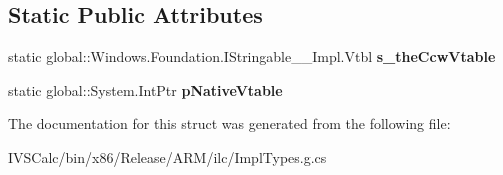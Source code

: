 \subsection*{Static Public Attributes}
\begin{DoxyCompactItemize}
\item 
\mbox{\label{struct_windows_1_1_foundation_1_1_i_stringable_____impl_1_1_vtbl_addee4ab2c4b52c956a53dc16a8f5fe38}} 
static global\+::\+Windows.\+Foundation.\+I\+Stringable\+\_\+\+\_\+\+Impl.\+Vtbl {\bfseries s\+\_\+the\+Ccw\+Vtable}
\item 
\mbox{\label{struct_windows_1_1_foundation_1_1_i_stringable_____impl_1_1_vtbl_ae97ef667155fc95dade9f885de704b3e}} 
static global\+::\+System.\+Int\+Ptr {\bfseries p\+Native\+Vtable}
\end{DoxyCompactItemize}


The documentation for this struct was generated from the following file\+:\begin{DoxyCompactItemize}
\item 
I\+V\+S\+Calc/bin/x86/\+Release/\+A\+R\+M/ilc/Impl\+Types.\+g.\+cs\end{DoxyCompactItemize}
